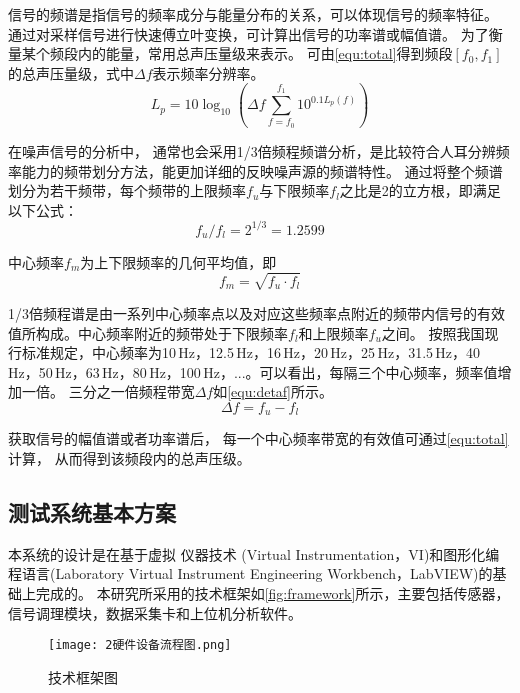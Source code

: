 信号的频谱是指信号的频率成分与能量分布的关系，可以体现信号的频率特征。
通过对采样信号进行快速傅立叶变换，可计算出信号的功率谱或幅值谱。
为了衡量某个频段内的能量，常用总声压量级来表示。
可由\autoref{equ:total}得到频段$\left [ f_0,f_1 \right ]$的总声压量级，式中$\Delta f$表示频率分辨率\cite{}。
\begin{equation}
    \label{equ:total}
    L_p=10\log_{10}{\left (\Delta f \sum_{f=f_0}^{f_1}10^{0.1L_p\left ( f \right )}    \right )  } 
\end{equation}

在噪声信号的分析中，
通常也会采用1/3倍频程频谱分析，是比较符合人耳分辨频率能力的频带划分方法，能更加详细的反映噪声源的频谱特性。
通过将整个频谱划分为若干频带，每个频带的上限频率$f_u$与下限频率$f_l$之比是2的立方根，即满足以下公式：
\begin{equation}
    \label{equ:fu}
    f_{u}/f_{l}=2^{1/3}=1.2599
\end{equation}

中心频率$f_{m}$为上下限频率的几何平均值，即
\begin{equation}
    \label{equ:fm}
    f_{m}=\sqrt{f_{u}\cdot f_{l} } 
\end{equation}

1/3倍频程谱是由一系列中心频率点以及对应这些频率点附近的频带内信号的有效值所构成。中心频率附近的频带处于下限频率$f_l$和上限频率$f_u$之间。
按照我国现行标准规定，中心频率为10\,Hz，12.5\,Hz，16\,Hz，20\,Hz，25\,Hz，31.5\,Hz，40\,Hz，50\,Hz，63\,Hz，80\,Hz，100\,Hz，...。可以看出，每隔三个中心频率，频率值增加一倍。
三分之一倍频程带宽$\Delta f$如\autoref{equ:detaf}所示。
\begin{equation}
    \label{equ:detaf}
    \Delta f=f_{u}-f_{l}
\end{equation}

获取信号的幅值谱或者功率谱后，
每一个中心频率带宽的有效值可通过\autoref{equ:total}计算，
从而得到该频段内的总声压级。

\subsection{测试系统基本方案}
本系统的设计是在基于虚拟
仪器技术 (Virtual Instrumentation，VI)和图形化编
程语言(Laboratory Virtual Instrument Engineering
Workbench，LabVIEW)的基础上完成的。
本研究所采用的技术框架如\autoref{fig:framework}所示，主要包括传感器，信号调理模块，数据采集卡和上位机分析软件。
\begin{figure}[htbp]
    \centering
    \texttt{[image: 2硬件设备流程图.png]}
    \caption{\label{fig:framework}技术框架图}
\end{figure}

